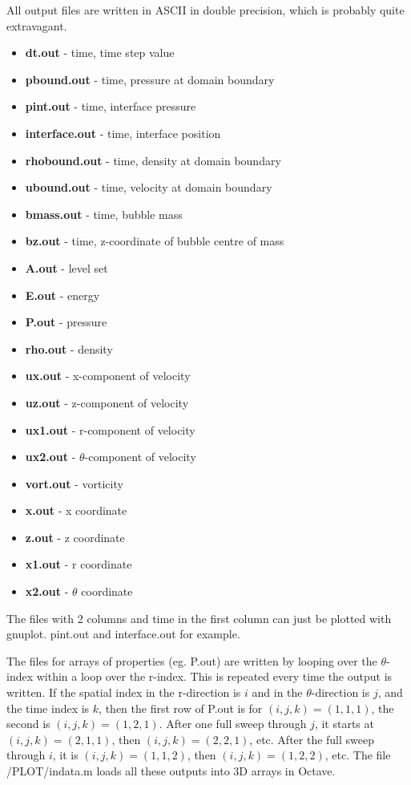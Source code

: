 \documentclass{article}
\begin{document}
All output files are written in ASCII in double precision, which is probably quite extravagant.
\begin{itemize}
\item \textbf{dt.out} - time, time step value
\item \textbf{pbound.out} - time, pressure at domain boundary
\item \textbf{pint.out} - time, interface pressure
\item \textbf{interface.out} - time, interface position
\item \textbf{rhobound.out} - time, density at domain boundary
\item \textbf{ubound.out} - time, velocity at domain boundary
\item \textbf{bmass.out} - time, bubble mass
\item \textbf{bz.out} - time, z-coordinate of bubble centre of mass
\item \textbf{A.out} - level set
\item \textbf{E.out} - energy
\item \textbf{P.out} - pressure
\item \textbf{rho.out} - density
\item \textbf{ux.out} - x-component of velocity
\item \textbf{uz.out} - z-component of velocity
\item \textbf{ux1.out} - r-component of velocity
\item \textbf{ux2.out} - $\theta$-component of velocity
\item \textbf{vort.out} - vorticity
\item \textbf{x.out} - x coordinate
\item \textbf{z.out} - z coordinate
\item \textbf{x1.out} - r coordinate
\item \textbf{x2.out} - $\theta$ coordinate
\end{itemize}

The files with 2 columns and time in the first column can just be plotted with gnuplot. pint.out and interface.out for example.

The files for arrays of properties (eg. P.out) are written by looping over the $\theta$-index within a loop over the r-index. This is repeated every time the output is written. If the spatial index in the r-direction is $i$ and in the $\theta$-direction is $j$, and the time index is $k$, then the first row of P.out is for $\left(i,j,k\right)=\left(1,1,1\right)$, the second is $\left(i,j,k\right)=\left(1,2,1\right)$. After one full sweep through $j$, it starts at $\left(i,j,k\right)=\left(2,1,1\right)$, then $\left(i,j,k\right)=\left(2,2,1\right)$, etc. After the full sweep through $i$, it is $\left(i,j,k\right)=\left(1,1,2\right)$, then $\left(i,j,k\right)=\left(1,2,2\right)$, etc. The file /PLOT/indata.m loads all these outputs into 3D arrays in Octave.
\end{document}
